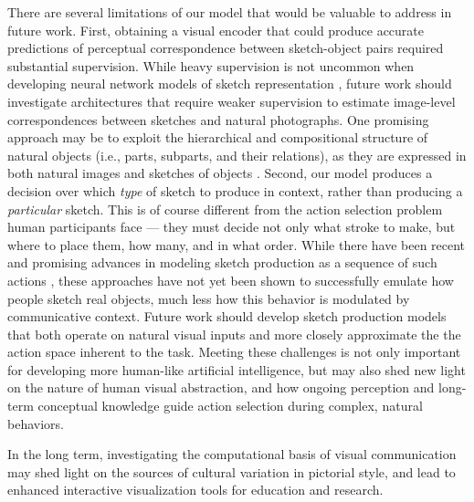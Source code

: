 \documentclass[9pt,twocolumn,twoside]{pnas-new}
\begin{document}

There are several limitations of our model that would be valuable to address in future work. 
First, obtaining a visual encoder that could produce accurate predictions of perceptual correspondence between sketch-object pairs required substantial supervision. 
While heavy supervision is not uncommon when developing neural network models of sketch representation \cite{sangkloy2016sketchy,yu2017sketch,song2017deep}, future work should investigate architectures that require weaker supervision to estimate image-level correspondences between sketches and natural photographs. 
One promising approach may be to exploit the hierarchical and compositional structure of natural objects (i.e., parts, subparts, and their relations), as they are expressed in both natural images and sketches of objects \cite{battaglia2016interaction,mrowca2018graph}.
Second, our model produces a decision over which \textit{type} of sketch to produce in context, rather than producing a \textit{particular} sketch.  
This is of course different from the action selection problem human participants face --- they must decide not only what stroke to make, but where to place them, how many, and in what order.
While there have been recent and promising advances in modeling sketch production as a sequence of such actions \cite{lake2015human,ha2017neural,ganin2018synthesizing}, these approaches have not yet been shown to successfully emulate how people sketch real objects, much less how this behavior is modulated by communicative context. 
Future work should develop sketch production models that both operate on natural visual inputs and more closely approximate the the action space inherent to the task.
Meeting these challenges is not only important for developing more human-like artificial intelligence, but may also shed new light on the nature of human visual abstraction, and how ongoing perception and long-term conceptual knowledge guide action selection during complex, natural behaviors. 

In the long term, investigating the computational basis of visual communication may shed light on the sources of cultural variation in pictorial style, and lead to enhanced interactive visualization tools for education and research.

\end{document}
